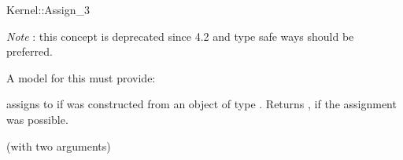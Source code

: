 \begin{ccRefFunctionObjectConcept}{Kernel::Assign_3}
\begin{ccDeprecated}
{\em Note} : this concept is deprecated since 4.2 and type safe ways should be preferred. 

A model for this must provide:


{assigns  to  if 
was constructed from an object of type .
Returns , if the assignment was possible.}

\ccRefines
{} (with two arguments)

\ccSeeAlso
 \\
 \\
  \\

\end{ccDeprecated}
\end{ccRefFunctionObjectConcept}

